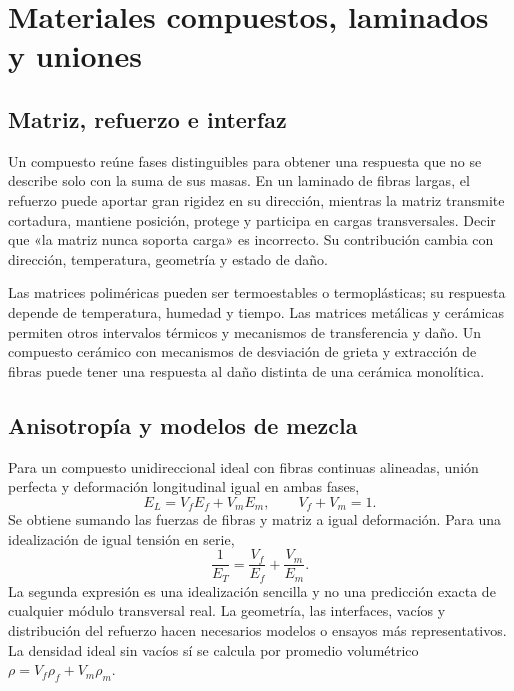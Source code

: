 \chapter{Materiales compuestos, laminados y uniones}\label{ch:09}
\section{Matriz, refuerzo e interfaz}
Un compuesto reúne fases distinguibles para obtener una respuesta que no se describe solo con la suma de sus masas. En un laminado de fibras largas, el refuerzo puede aportar gran rigidez en su dirección, mientras la matriz transmite cortadura, mantiene posición, protege y participa en cargas transversales. Decir que «la matriz nunca soporta carga» es incorrecto. Su contribución cambia con dirección, temperatura, geometría y estado de daño.

Las matrices poliméricas pueden ser termoestables o termoplásticas; su respuesta depende de temperatura, humedad y tiempo. Las matrices metálicas y cerámicas permiten otros intervalos térmicos y mecanismos de transferencia y daño. Un compuesto cerámico con mecanismos de desviación de grieta y extracción de fibras puede tener una respuesta al daño distinta de una cerámica monolítica.
\section{Anisotropía y modelos de mezcla}
Para un compuesto unidireccional ideal con fibras continuas alineadas, unión perfecta y deformación longitudinal igual en ambas fases,
\begin{equation}E_L=V_f E_f+V_m E_m,\qquad V_f+V_m=1.\label{eq:mezclaL}\end{equation}
Se obtiene sumando las fuerzas de fibras y matriz a igual deformación. Para una idealización de igual tensión en serie,
\begin{equation}\frac1{E_T}=\frac{V_f}{E_f}+\frac{V_m}{E_m}.\label{eq:mezclaT}\end{equation}
La segunda expresión es una idealización sencilla y no una predicción exacta de cualquier módulo transversal real. La geometría, las interfaces, vacíos y distribución del refuerzo hacen necesarios modelos o ensayos más representativos. La densidad ideal sin vacíos sí se calcula por promedio volumétrico $\rho=V_f\rho_f+V_m\rho_m$.
